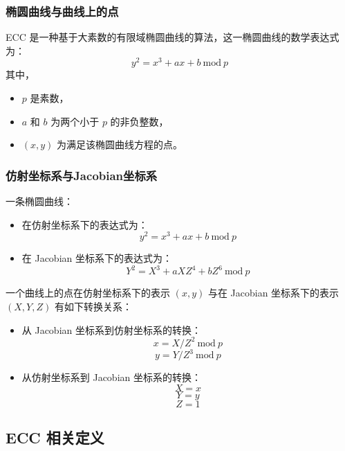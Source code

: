 \documentclass[main\_\_CN.tex]{subfiles}
\begin{document}
\subsubsection{椭圆曲线与曲线上的点}

ECC 是一种基于大素数的有限域椭圆曲线的算法，这一椭圆曲线的数学表达式为：
\[
{y}^{2} = {x}^{3} + {ax} + b \ \textrm{mod}\ p
\]
其中，
\begin{itemize}
    \item $p$ 是素数，
    \item $a$ 和 $b$ 为两个小于 $p$ 的非负整数，
    \item $(x, y)$ 为满足该椭圆曲线方程的点。
\end{itemize}

\subsubsection{仿射坐标系与Jacobian坐标系}

一条椭圆曲线：
\begin{itemize}
    \item 在仿射坐标系下的表达式为：
    \[
    {y}^{2} = {x}^{3} + {ax} + b \ \textrm{mod}\ p
    \]
    \item 在 Jacobian 坐标系下的表达式为：
    \[
    {Y}^{2} = {X}^{3} + {aXZ}^{4} + {bZ}^{6} \ \textrm{mod}\ p
    \]
\end{itemize}

一个曲线上的点在仿射坐标系下的表示 $(x, y)$ 与在 Jacobian 坐标系下的表示 $(X, Y, Z)$ 有如下转换关系：

\begin{itemize}
    \item 从 Jacobian 坐标系到仿射坐标系的转换：
    \[
    x = X / {Z}^2 \ \textrm{mod}\ p
    \]
    \[
    y = Y / {Z}^3 \ \textrm{mod}\ p
    \]
    \item 从仿射坐标系到 Jacobian 坐标系的转换：
    \[ X = x \]
    \[ Y = y \]
    \[ Z = 1\]
\end{itemize}


\subsection{\chipname{} ECC 相关定义}
\end{document}
